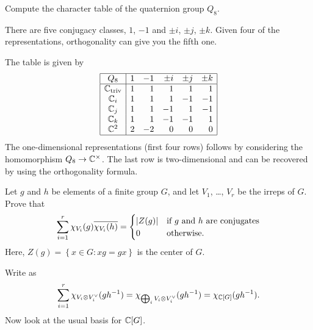 \begin{problem}
	[Quaternions]
	Compute the character table of the quaternion group $Q_8$.
	\begin{hint}
		There are five conjugacy classes, $1$, $-1$
		and $\pm i$, $\pm j$, $\pm k$.
		Given four of the representations, orthogonality
		can give you the fifth one.
	\end{hint}
	\begin{sol}
		The table is given by
		\[
			\begin{array}{|c|rrrrr|}
				\hline
				Q_8 & 1 & -1 & \pm i & \pm j & \pm k \\ \hline
				\mathbb C_{\mathrm{triv}} & 1 & 1 & 1 & 1 & 1 \\
				\mathbb C_i & 1 & 1 & 1 & -1 & -1 \\
				\mathbb C_j & 1 & 1 & -1 & 1 & -1 \\
				\mathbb C_k & 1 & 1 & -1 & -1 & 1 \\
				\mathbb C^2 & 2 & -2 & 0 & 0 & 0 \\\hline
			\end{array}
		\]
		The one-dimensional representations (first four rows)
		follows by considering the homomorphism $Q_8 \to \mathbb C^\times$.
		The last row is two-dimensional and can be recovered
		by using the orthogonality formula.
	\end{sol}
\end{problem}

\begin{sproblem}
	\label{prob:second_orthog}
	\gim
	Let $g$ and $h$ be elements of a finite group $G$,
	and let $V_1$, \dots, $V_r$ be the irreps of $G$.
	Prove that
	\[
		\sum_{i = 1}^r \chi_{V_i}(g) \overline{\chi_{V_i}(h)}
		=
		\begin{cases}
			|Z(g)| & \text{if $g$ and $h$ are conjugates} \\
			0 & \text{otherwise}.
		\end{cases}
	\]
	Here, $Z(g) = \left\{ x \in G : xg = gx \right\}$
	is the center of $G$.
	\begin{hint}
		Write as 
		\[ \sum_{i=1}^r \chi_{V_i \otimes V_i^\vee} (gh^{-1})
			= \chi_{\bigoplus_i V_i \otimes V_i^\vee}(gh^{-1})
			= \chi_{\mathbb C[G]}(gh^{-1}).
		\]
		Now look at the usual basis for $\mathbb C[G]$.
	\end{hint}
\end{sproblem}
